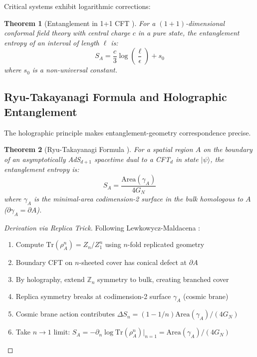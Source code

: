 \documentclass[11pt,a4paper]{article}
\newtheorem{theorem}{Theorem}[section]
\theoremstyle{remark}
\theoremstyle{definition}
\begin{document}
Critical systems exhibit logarithmic corrections:

\begin{theorem}[Entanglement in 1+1 CFT \cite{Holzhey1994,Calabrese2004}]
For a $(1+1)$-dimensional conformal field theory with central charge $c$ in a pure state, the entanglement entropy of an interval of length $\ell$ is:
\begin{equation}
S_A = \frac{c}{3} \log\left(\frac{\ell}{\epsilon}\right) + s_0
\end{equation}
where $s_0$ is a non-universal constant.
\end{theorem}

\subsection{Ryu-Takayanagi Formula and Holographic Entanglement}

The holographic principle makes entanglement-geometry correspondence precise.

\begin{theorem}[Ryu-Takayanagi Formula \cite{Ryu2006}]
\label{thm:ryu_takayanagi}
For a spatial region $A$ on the boundary of an asymptotically AdS$_{d+1}$ spacetime dual to a CFT$_d$ in state $|\psi\rangle$, the entanglement entropy is:
\begin{equation}
S_A = \frac{\text{Area}(\gamma_A)}{4 G_N}
\end{equation}
where $\gamma_A$ is the minimal-area codimension-2 surface in the bulk homologous to $A$ ($\partial \gamma_A = \partial A$).
\end{theorem}

\begin{proof}[Derivation via Replica Trick]
Following Lewkowycz-Maldacena \cite{Lewkowycz2013}:
\begin{enumerate}
\item Compute $\text{Tr}(\rho_A^n) = Z_n/Z_1^n$ using $n$-fold replicated geometry
\item Boundary CFT on $n$-sheeted cover has conical defect at $\partial A$
\item By holography, extend $\mathbb{Z}_n$ symmetry to bulk, creating branched cover
\item Replica symmetry breaks at codimension-2 surface $\gamma_A$ (cosmic brane)
\item Cosmic brane action contributes $\Delta S_n = (1-1/n) \text{Area}(\gamma_A)/(4G_N)$
\item Take $n \to 1$ limit: $S_A = -\partial_n \log \text{Tr}(\rho_A^n)|_{n=1} = \text{Area}(\gamma_A)/(4G_N)$
\end{enumerate}
\end{proof}
\end{document}
